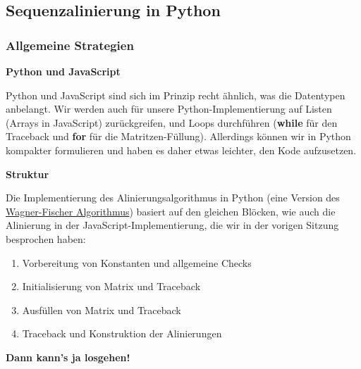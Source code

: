 
\subsection{Sequenzalinierung in Python}

\subsubsection{\texorpdfstring{{Allgemeine
Strategien}}{Allgemeine Strategien}}

\vspace{0.5cm}\par\noindent\textbf{Python und JavaScript}\vspace{0.5cm}

Python und JavaScript sind sich im Prinzip recht ähnlich, was die
Datentypen anbelangt. Wir werden auch für unsere Python-Implementierung
auf Listen (Arrays in JavaScript) zurückgreifen, und Loops durchführen
(\textbf{while} für den Traceback und \textbf{for} für die
Matritzen-Füllung). Allerdings können wir in Python kompakter
formulieren und haben es daher etwas leichter, den Kode aufzusetzen.




\vspace{0.5cm}\par\noindent\textbf{Struktur}\vspace{0.5cm}

Die Implementierung des Alinierungsalgorithmus in Python (eine Version
des \href{http://bibliography.lingpy.org?key=Wagner1974}{Wagner-Fischer
Algorithmus}) basiert auf den gleichen Blöcken, wie auch die Alinierung
in der JavaScript-Implementierung, die wir in der vorigen Sitzung
besprochen haben:

\begin{enumerate}
\itemsep1pt\parskip0pt
\item
  Vorbereitung von Konstanten und allgemeine Checks
\item
  Initialisierung von Matrix und Traceback
\item
  Ausfüllen von Matrix und Traceback
\item
  Traceback und Konstruktion der Alinierungen
\end{enumerate}




\vspace{0.5cm}\par\noindent\textbf{Dann kann's ja losgehen!}\vspace{0.5cm}

